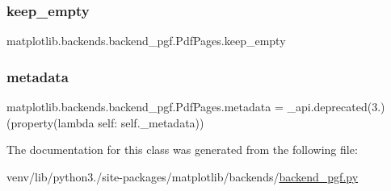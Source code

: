 \subsubsection{\texorpdfstring{keep\+\_\+empty}{keep\_empty}}
{\footnotesize\ttfamily matplotlib.\+backends.\+backend\+\_\+pgf.\+Pdf\+Pages.\+keep\+\_\+empty}

\mbox{\label{classmatplotlib_1_1backends_1_1backend__pgf_1_1PdfPages_abc6bfec62cb55e092bf709e7b0cf6dfb}} 
\subsubsection{\texorpdfstring{metadata}{metadata}}
{\footnotesize\ttfamily matplotlib.\+backends.\+backend\+\_\+pgf.\+Pdf\+Pages.\+metadata = \+\_\+api.\+deprecated(\textquotesingle{}3.\textquotesingle{})(property(lambda self\+: self.\+\_\+metadata))\hspace{0.3cm}{\ttfamily [static]}}



The documentation for this class was generated from the following file\+:\begin{DoxyCompactItemize}
\item 
venv/lib/python3./site-\/packages/matplotlib/backends/\hyperlink{backend__pgf_8py}{backend\+\_\+pgf.\+py}\end{DoxyCompactItemize}
